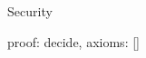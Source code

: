 \begin{lexlean}{Security}
\begin{semanticmodule}
{  proof: decide{},
  axioms: []
}
\end{semanticmodule}
\end{lexlean}

